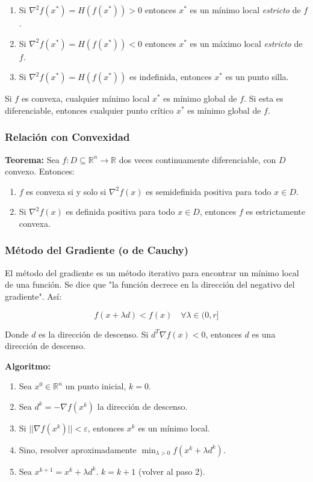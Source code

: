 \documentclass{article}
\begin{document}
\begin{enumerate}
    \item Si $\nabla^2f(x^*)=H(f(x^*)) > 0$ entonces $x^*$ es un mínimo local \textit{estricto} de $f$.
    \item Si $\nabla^2f(x^*)=H(f(x^*)) < 0$ entonces $x^*$ es un máximo local \textit{estricto} de $f$.
    \item Si $\nabla^2f(x^*)=H(f(x^*))$ es indefinida, entonces $x^*$ es un punto silla.
\end{enumerate}

Si $f$ es convexa, cualquier mínimo local $x^*$ es mínimo global de $f$. Si esta es diferenciable, entonces cualquier punto crítico $x^*$ es mínimo global de $f$.

\subsubsection{Relación con Convexidad}

\textbf{Teorema:} Sea $f:D \subseteq \mathbb{R}^n \to \mathbb{R}$ dos veces continuamente diferenciable, con $D$ convexo. Entonces:

\begin{enumerate}
    \item $f$ es convexa si y solo si $\nabla^2 f(x)$ es semidefinida positiva para todo $x \in D$.
    \item Si $\nabla^2 f(x)$ es definida positiva para todo $x \in D$, entonces $f$ es estrictamente convexa.
\end{enumerate}

\subsubsection{Método del Gradiente (o de Cauchy)}

El método del gradiente es un método iterativo para encontrar un mínimo local de una función. Se dice que "la función decrece en la dirección del negativo del gradiente". Así:

\begin{equation*}
    f(x+\lambda d) < f(x) \quad \forall \lambda \in (0, r]
\end{equation*}

Donde $d$ es la dirección de descenso. Si $d^T \nabla f(x) < 0$, entonces $d$ es una dirección de descenso.

\textbf{Algoritmo:}

\begin{enumerate}
    \item Sea $x^0 \in \mathbb{R}^n$ un punto inicial, $k=0$.
    \item Sea $d^k = -\nabla f(x^k)$ la dirección de descenso.
    \item Si $||\nabla f(x^k)|| < \varepsilon$, entonces $x^k$ es un mínimo local.
    \item Sino, resolver aproximadamente $\min_{\lambda>0} f(x^k + \lambda d^k)$.
    \item Sea $x^{k+1}=x^k + \lambda d^k$. $k = k+1$ (volver al paso 2).
\end{enumerate}
\end{document}
